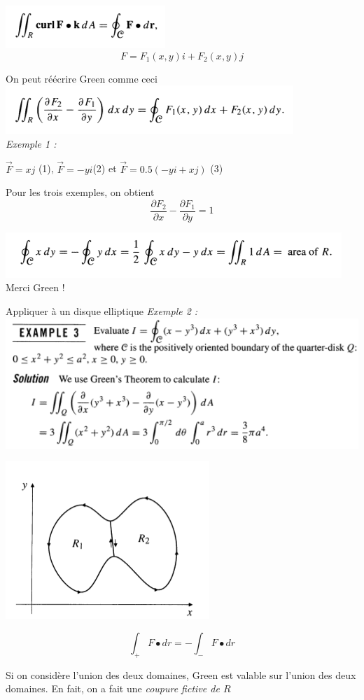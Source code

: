 \includegraphics[scale=0.7]{image4.png}\\

\[F=F_1(x,y)i+F_2(x,y)j\]

On peut réécrire Green comme ceci\\
\includegraphics[scale=0.7]{image5.png}\\
\textit{
Exemple 1 : }

$\vec F=xj$ (1), $\vec F = -y i$(2) et $\vec F = 0.5 ( -y i +x j )$ (3)

Pour les trois exemples, on obtient \[\frac{\partial F_2}{\partial x}- \frac{\partial F_1}{\partial y} = 1\]

\includegraphics[scale=0.7]{image6.png}\\

Merci Green !

Appliquer à un disque elliptique
\textit{
Exemple 2 : }\\
\includegraphics[scale=0.7]{image7.png}\\

\begin{myrem}

\includegraphics[scale=0.8]{image8.png}

\[\int_+ F\bullet dr = - \int_- F\bullet dr\]

Si on considère l'union des deux domaines, Green est valable sur l'union des deux domaines. En fait, on a fait une \emph{coupure fictive de $R$}
\end{myrem}



